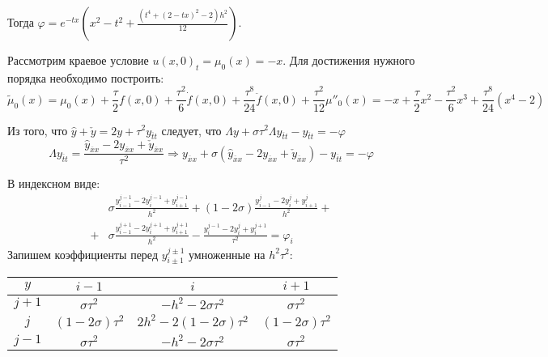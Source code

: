 \documentclass[a4paper]{article}
\begin{document}
	Тогда $\varphi = e^{-t x} (x^2 - t^2 + \frac{(t^4+ (2 - t x)^2 - 2)h^2}{12})$.
	
	Рассмотрим краевое условие $u(x, 0)_t = \mu_0(x) = -x$. Для достижения нужного порядка необходимо построить:
	$$ \tilde{\mu}_0(x) = \mu_0(x) + \frac{\tau}{2}f(x, 0) + \frac{\tau^2}{6}\dot{f}(x, 0) + \frac{\tau^8}{24}\ddot{f}(x, 0) + \frac{\tau^2}{12}\mu''_0(x) = -x + \frac{\tau}{2} x^2 - \frac{\tau^2}{6} x^3  + \frac{\tau^8}{24} (x^4 - 2)$$
	
	Из того, что $\hat{y} + \check{y} = 2y + \tau^2 y_{\overline{t}t}$ следует, что $\Lambda y + \sigma \tau^2 \Lambda y_{\overline{t}t} - y_{\overline{t}t} = -\varphi$
	$$\Lambda y_{\overline{t}t} = \frac{\hat{y}_{\overline{x}x} - 2y_{\overline{x}x} + \check{y}_{\overline{x}x}}{\tau^2} \Rightarrow y_{\overline{x}x} + \sigma (\hat{y}_{\overline{x}x} - 2y_{\overline{x}x} + \check{y}_{\overline{x}x}) - y_{\overline{t}t} = -\varphi$$
	
	В индексном виде:
	\begin{align*}
		&\sigma \frac{y^{j-1}_{i-1} - 2 y^{j-1}_i + y^{j-1}_{i+1}}{h^2} +
		(1 - 2 \sigma)\frac{y^j_{i-1} - 2 y^j_i + y^j_{i+1}}{h^2} + \\ +
		&\sigma \frac{y^{j+1}_{i-1} - 2 y^{j+1}_i + y^{j+1}_{i+1}}{h^2} - 
		\frac{y^{j-1}_i - 2 y^j_i + y^{j+1}_i}{\tau^2} = \varphi_i
	\end{align*}
	Запишем коэффициенты перед $y_{i \pm 1}^{j \pm 1}$ умноженные на $h^2\tau^2$:
	
	\begin{center}
	\begin{tabular}{| c | c c c |}
		\hline
		$y$ & $i - 1$ & $i$ & $i + 1$ \\
		\hline
		$j + 1$ & $\sigma \tau^2$ & $-h^2 - 2\sigma \tau^2$ & $\sigma\tau^2$ \\
		$j$ & $(1 - 2\sigma) \tau^2$  & $2h^2 - 2(1 - 2\sigma)\tau^2$ & $(1 - 2\sigma) \tau^2$ \\
		$j - 1$ & $\sigma \tau^2$ & $-h^2 - 2\sigma \tau^2$ & $\sigma\tau^2$ \\
		\hline
	\end{tabular}
	\end{center}
		
\end{document}
